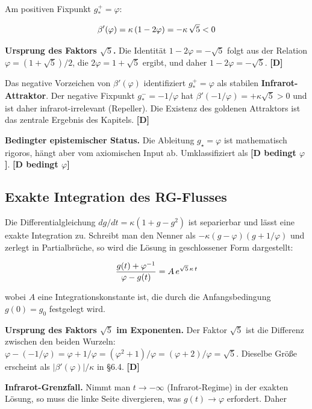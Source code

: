 ﻿\documentclass[11pt,letterpaper]{article}
\begin{document}
Am positiven Fixpunkt $g_*^+ = \varphi$:

\begin{equation*}
  \resizebox{\ifdim\width>\linewidth \linewidth\else\width\fi}{!}{$\displaystyle \beta'(\varphi) = \kappa\,(1 - 2\varphi) = -\kappa\,\sqrt{5} < 0$}
\end{equation*}

\textbf{Ursprung des Faktors $\sqrt{5}$.} Die Identität $1 - 2\varphi = -\sqrt{5}$ folgt aus der Relation $\varphi = (1 + \sqrt{5})/2$, die $2\varphi = 1 + \sqrt{5}$ ergibt, und daher $1 - 2\varphi = -\sqrt{5}$. \textbf{[D]}

Das negative Vorzeichen von $\beta'(\varphi)$ identifiziert $g_*^+ = \varphi$ als stabilen \textbf{Infrarot-Attraktor}. Der negative Fixpunkt $g_*^- = -1/\varphi$ hat $\beta'(-1/\varphi) = +\kappa\sqrt{5} > 0$ und ist daher infrarot-irrelevant (Repeller). Die Existenz des goldenen Attraktors ist das zentrale Ergebnis des Kapitels. \textbf{[D]}

\textbf{Bedingter epistemischer Status.} Die Ableitung $g_\star = \varphi$ ist mathematisch rigoros, hängt aber vom axiomischen Input ab. Umklassifiziert als \textbf{[D bedingt $\varphi$]}. \textbf{[D bedingt $\varphi$]}
\subsection{Exakte Integration des RG-Flusses}
Die Differentialgleichung $dg/dt = \kappa(1 + g - g^2)$ ist separierbar und lässt eine exakte Integration zu. Schreibt man den Nenner als $-\kappa(g - \varphi)(g + 1/\varphi)$ und zerlegt in Partialbrüche, so wird die Lösung in geschlossener Form dargestellt:

\begin{equation*}
  \resizebox{\ifdim\width>\linewidth \linewidth\else\width\fi}{!}{$\displaystyle \frac{g(t) + \varphi^{-1}}{\varphi - g(t)} = A\,e^{\sqrt{5}\,\kappa\,t}$}
\end{equation*}

wobei $A$ eine Integrationskonstante ist, die durch die Anfangsbedingung $g(0) = g_0$ festgelegt wird.

\textbf{Ursprung des Faktors $\sqrt{5}$ im Exponenten.} Der Faktor $\sqrt{5}$ ist die Differenz zwischen den beiden Wurzeln: $\varphi - (-1/\varphi) = \varphi + 1/\varphi = (\varphi^2 + 1)/\varphi = (\varphi + 2)/\varphi = \sqrt{5}$. Dieselbe Größe erscheint als $|\beta'(\varphi)|/\kappa$ in §6.4. \textbf{[D]}

\textbf{Infrarot-Grenzfall.} Nimmt man $t \to -\infty$ (Infrarot-Regime) in der exakten Lösung, so muss die linke Seite divergieren, was $g(t) \to \varphi$ erfordert. Daher
\end{document}
